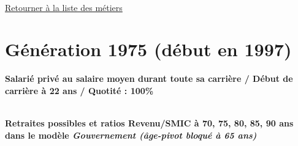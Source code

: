 

   
 \localtableofcontents 

~\\ 
 
 \hyperlink{page.2}{\noindent Retourner à la liste des métiers}

 \newpage 

\section{Génération 1975 (début en 1997)\label{SMPT_100_22_1975_0}} 
 
{\bf \noindent Salarié privé au salaire moyen durant toute sa carrière / Début de carrière à 22 ans / Quotité : 100\%}  ~ 

 ~\\{\bf \noindent Retraites possibles et ratios Revenu/SMIC à 70, 75, 80, 85, 90 ans dans le modèle \emph{Gouvernement (âge-pivot bloqué à 65 ans)}}  
 
